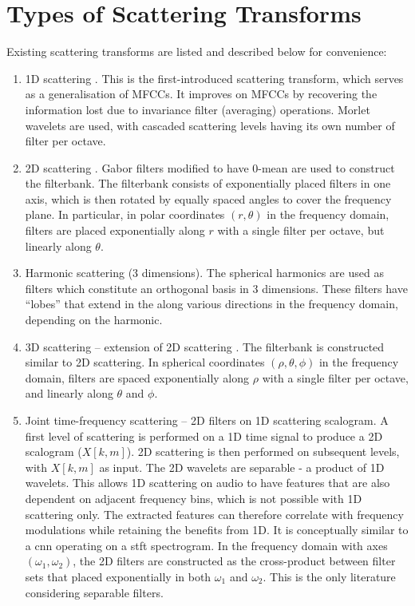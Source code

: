 \section{Types of Scattering Transforms}
Existing scattering transforms are listed and described below for convenience:
\begin{enumerate}
    \item 1D scattering \citep{1dscattering1, ws}. This is the first-introduced scattering transform, which serves as a generalisation of MFCCs. It improves on MFCCs by recovering the information lost due to invariance filter (averaging) operations. Morlet wavelets are used, with cascaded scattering levels having its own number of filter per octave.
    \item 2D scattering \citep{2dscattering}. Gabor filters modified to have 0-mean are used to construct the filterbank. The filterbank consists of exponentially placed filters in one axis, which is then rotated by equally spaced angles to cover the frequency plane. In particular, in polar coordinates $(r, \theta)$ in the frequency domain, filters are placed exponentially along $r$ with a single filter per octave, but linearly along $\theta$.
    \item Harmonic scattering \citep{harmonicscattering} (3 dimensions). The spherical harmonics are used as filters which constitute an orthogonal basis in 3 dimensions. These filters have ``lobes'' that extend in the along various directions in the frequency domain, depending on the harmonic.
    \item 3D scattering -- extension of 2D scattering \citep{3dscattering}. The filterbank is constructed similar to 2D scattering. In spherical coordinates $(\rho, \theta, \phi)$ in the frequency domain, filters are spaced exponentially along $\rho$ with a single filter per octave, and linearly along $\theta$ and $\phi$.
    \item Joint time-frequency \citep{ws_joint_tf,jointtfscattering2} scattering -- 2D filters on 1D scattering scalogram. A first level of scattering is performed on a 1D time signal to produce a 2D scalogram ($X[k, m]$). 2D scattering is then performed on subsequent levels, with $X[k, m]$ as input. The 2D wavelets are separable - a product of 1D wavelets. This allows 1D scattering on audio to have features that are also dependent on adjacent frequency bins, which is not possible with 1D scattering only. The extracted features can therefore correlate with frequency modulations while retaining the benefits from 1D. It is conceptually similar to a \ac{cnn} operating on a \ac{stft} spectrogram. In the frequency domain with axes $(\omega_1, \omega_2)$, the 2D filters are constructed as the cross-product between filter sets that placed exponentially in both $\omega_1$ and $\omega_2$.
    This is the only literature considering separable filters.
\end{enumerate}

